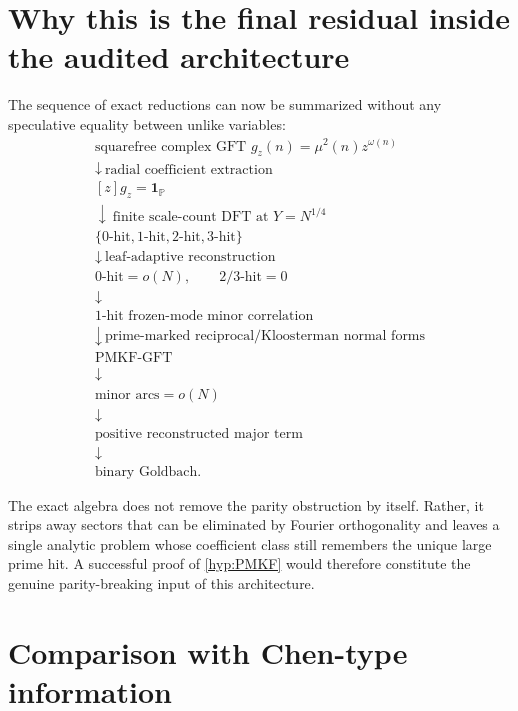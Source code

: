 \documentclass[11pt]{article}
\theoremstyle{definition}
\theoremstyle{remark}
\newcommand{\Pp}{\mathbb P}
\newcommand{\1}{\mathbf 1}
\newcommand{\PMKF}{\mathrm{PMKF}\text{-}\mathrm{GFT}}
\begin{document}
\section{Why this is the final residual inside the audited architecture}

The sequence of exact reductions can now be summarized without any speculative equality between unlike variables:
\begin{equation}\label{eq:proof-graph}
\boxed{
\begin{array}{c}
\text{squarefree complex GFT }g_z(n)=\mu^2(n)z^{\omega(n)}
\\[1mm]
\downarrow\ \text{radial coefficient extraction}
\\[1mm]
[z]g_z=\1_{\Pp}
\\[1mm]
\downarrow\ \text{finite scale-count DFT at }Y=N^{1/4}
\\[1mm]
\{0\text{-hit},1\text{-hit},2\text{-hit},3\text{-hit}\}
\\[1mm]
\downarrow\ \text{leaf-adaptive reconstruction}
\\[1mm]
0\text{-hit}=o(N),\qquad 2/3\text{-hit}=0
\\[1mm]
\downarrow
\\[-1mm]
\boxed{1\text{-hit frozen-mode minor correlation}}
\\[1mm]
\downarrow\ \text{prime-marked reciprocal/Kloosterman normal forms}
\\[1mm]
\boxed{\PMKF}
\\[1mm]
\downarrow
\\[-1mm]
\text{minor arcs}=o(N)
\\[1mm]
\downarrow
\\[-1mm]
\text{positive reconstructed major term}
\\[1mm]
\downarrow
\\[-1mm]
\text{binary Goldbach.}
\end{array}}
\end{equation}

The exact algebra does not remove the parity obstruction by itself.  Rather, it strips away sectors that can be eliminated by Fourier orthogonality and leaves a single analytic problem whose coefficient class still remembers the unique large prime hit.  A successful proof of \cref{hyp:PMKF} would therefore constitute the genuine parity-breaking input of this architecture.

\section{Comparison with Chen-type information}
\end{document}
